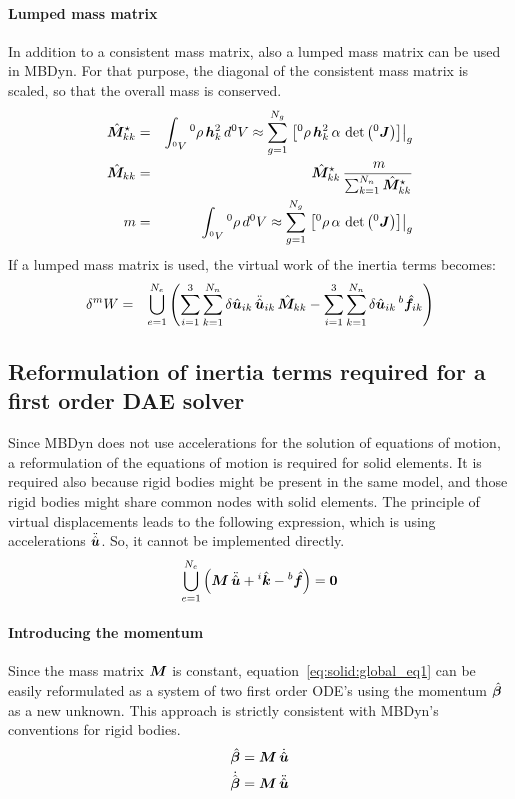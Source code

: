 \paragraph{Lumped mass matrix}
In addition to a consistent mass matrix, also a lumped mass matrix can be used in MBDyn.
For that purpose, the diagonal of the consistent mass matrix is scaled, so that the overall mass is conserved.
\begin{eqnarray}
\hat{\bm{M}}_{kk}^{\star} & = & \int_{^0V} {^0}\rho \, \bm{h}_k^2 \, d^0V \approx \sum_{g=1}^{N_g} \left.\left[{^0}\rho \, \bm{h}_k^2 \, \alpha \, \det{\left({^0}\bm{J}\right)}\right]\right\vert_{g} \\
\hat{\bm{M}}_{kk}&=&\hat{\bm{M}}_{kk}^{\star} \, \frac{\,m}{\sum_{k=1}^{N_n}\hat{\bm{M}}_{kk}^{\star}} \\
m&=&\int_{^0V}{^0}\rho\,d{^0V} \approx \sum_{g=1}^{N_g} \left.\left[{^0}\rho \, \alpha \, \det{\left(^0\bm{J}\right)}\right]\right\vert_{g}
\end{eqnarray}
If a lumped mass matrix is used, the virtual work of the inertia terms becomes:
\begin{eqnarray}
\delta^{m}W & = & \bigcup_{e=1}^{N_e}\left(\sum_{i=1}^3\sum_{k=1}^{N_n}\delta\hat{\bm{u}}_{ik} \, \ddot{\hat{\bm{u}}}_{ik} \, \hat{\bm{M}}_{kk}
 - \sum_{i=1}^3\sum_{k=1}^{N_n} \delta\hat{\bm{u}}_{ik} \, {^b}\hat{\bm{f}}_{ik}\right)
\end{eqnarray}

\subsection{Reformulation of inertia terms required for a first order DAE solver}
Since MBDyn does not use accelerations for the solution of equations of motion, a reformulation of the equations of motion is required for solid elements.
It is required also because rigid bodies might be present in the same model, and those rigid bodies might share common nodes with solid elements.
The principle of virtual displacements leads to the following expression, which is using accelerations $\ddot{\hat{\bm{u}}}$.
So, it cannot be implemented directly.
\begin{eqnarray}
\bigcup_{e=1}^{N_e} \left(\bm{M} \, \ddot{\hat{\bm{u}}} + {^i}\hat{\bm{k}} - {^b}\hat{\bm{f}}\right) = \bm{0} \label{eq:solid:global_eq1}
\end{eqnarray}

\paragraph{Introducing the momentum}
Since the mass matrix $\bm{M}$ is constant,
equation~\ref{eq:solid:global_eq1} can be easily reformulated as a system of two first order ODE's
using the momentum $\hat{\bm{\beta}}$ as a new unknown.
This approach is strictly consistent with MBDyn's conventions for rigid bodies.
\begin{eqnarray}
\hat{\bm{\beta}}=\bm{M}\,\dot{\hat{\bm{u}}} \label{eq:solid:beta} \\
\dot{\hat{\bm{\beta}}}=\bm{M}\,\ddot{\hat{\bm{u}}} \label{eq:solid:betadot}
\end{eqnarray}

